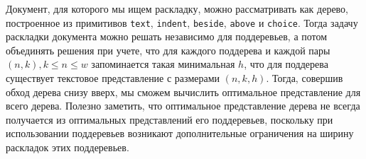 Документ, для которого мы ищем раскладку, можно рассматривать как дерево, построенное из примитивов
\lstinline[language=Haskell]{text},
\lstinline[language=Haskell]{indent},
\lstinline[language=Haskell]{beside},
\lstinline[language=Haskell]{above} и \lstinline[language=Haskell]{choice}. Тогда задачу
раскладки документа можно решать независимо для поддеревьев, а потом объединять решения
при учете, что для каждого поддерева
и каждой пары $(n, k), k \le n \le w$ запоминается такая минимальная $h$, что для поддерева существует
текстовое представление с размерами $(n, k, h)$. Тогда, совершив обход дерева снизу вверх, мы сможем
вычислить оптимальное представление для всего дерева. Полезно заметить,
что оптимальное представление дерева не всегда получается из оптимальных представлений его
поддеревьев, поскольку при использовании поддеревьев возникают дополнительные
ограничения на ширину раскладок этих поддеревьев.

